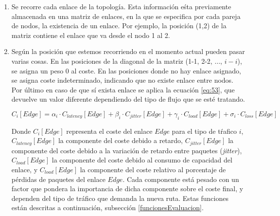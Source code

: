 \documentclass[a4paper,11pt]{book}
\begin{document}
\begin{enumerate}
\item Se recorre cada enlace de la topología. Esta información eśta previamente almacenada en una matriz de enlaces, en la que se especifica por cada pareja de nodos, la existencia de un enlace. Por ejemplo, la posición (1,2) de la matriz contiene el enlace que va desde el nodo 1 al 2.

\item Según la posición que estemos recorriendo en el momento actual pueden pasar varias cosas. En las posiciones de la diagonal de la matriz (1-1, 2-2, $\ldots$, $i-i$), se asigna un peso 0 al coste. En las posiciones donde no hay enlace asignado, se asigna coste indeterminado, indicando que no existe enlace entre nodos. Por último en caso de que sí exista enlace se aplica la ecuación \ref{eq:53}, que devuelve un valor diferente dependiendo del tipo de flujo que se esté tratando.

\begin{equation}
C_{i}[Edge] = \alpha_i \cdot C_{latency}[Edge] + \beta_i \cdot C_{jitter}[Edge] + \gamma_i \cdot C_{load}[Edge] +\sigma_i \cdot C_{loss}[Edge]
\label{eq:53}
\end{equation}

 Donde $C_i[Edge]$ representa el coste del enlace $Edge$ para el tipo de tŕafico $i$, $C_{latency}[Edge]$ la componente del coste debido a retardo, $C_{jitter}[Edge]$ la componente del coste debido a la variación de retardo entre paquetes (\emph{jitter}), $C_{load}[Edge]$ la componente del coste debido al consumo de capacidad del enlace, y $C_{load}[Edge]$ la componente del coste relativo al porcentaje de pérdidas de paquetes del enlace $Edge$. Cada componente está pesado con un factor que pondera la importancia de dicha componente sobre el coste final, y dependen del tipo de tráfico que demanda la nueva ruta. Estas funciones están descritas a continuación, subsección \ref{funcionesEvaluacion}.



\end{enumerate}
\end{document}
